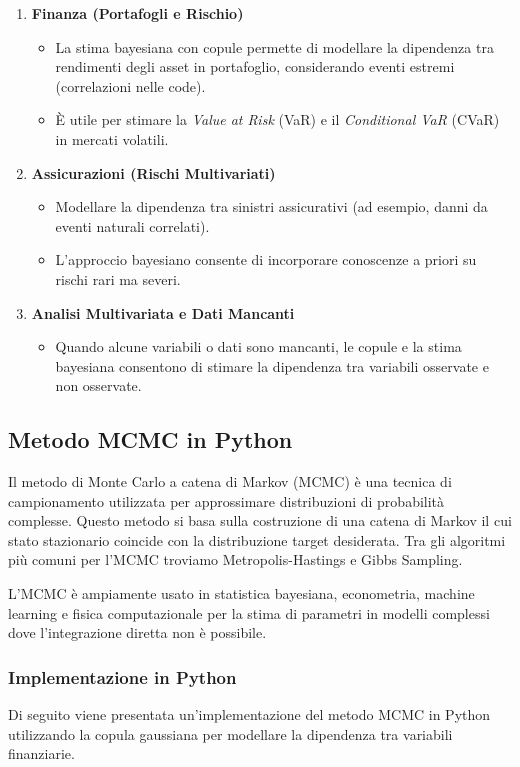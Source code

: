 \documentclass[%
	corpo=11pt,
    twoside,
    stile=classica,
    oldstyle,
    tipotesi=custom,
    greek,
    evenboxes,
]{toptesi}
\begin{document}
\begin{enumerate}
	\item \textbf{Finanza (Portafogli e Rischio)}
	\begin{itemize}
		\item La stima bayesiana con copule permette di modellare la dipendenza tra rendimenti degli asset in portafoglio, considerando eventi estremi (correlazioni nelle code).
		\item È utile per stimare la \textit{Value at Risk} (VaR) e il \textit{Conditional VaR} (CVaR) in mercati volatili.
	\end{itemize}
	
	\item \textbf{Assicurazioni (Rischi Multivariati)}
	\begin{itemize}
		\item Modellare la dipendenza tra sinistri assicurativi (ad esempio, danni da eventi naturali correlati).
		\item L’approccio bayesiano consente di incorporare conoscenze a priori su rischi rari ma severi.
	\end{itemize}
	
	\item \textbf{Analisi Multivariata e Dati Mancanti}
	\begin{itemize}
		\item Quando alcune variabili o dati sono mancanti, le copule e la stima bayesiana consentono di stimare la dipendenza tra variabili osservate e non osservate.
	\end{itemize}
\end{enumerate}

\subsection{Metodo MCMC in Python}
Il metodo di Monte Carlo a catena di Markov (MCMC) è una tecnica di campionamento utilizzata per approssimare distribuzioni di probabilità complesse. Questo metodo si basa sulla costruzione di una catena di Markov il cui stato stazionario coincide con la distribuzione target desiderata. Tra gli algoritmi più comuni per l'MCMC troviamo Metropolis-Hastings e Gibbs Sampling.

L'MCMC è ampiamente usato in statistica bayesiana, econometria, machine learning e fisica computazionale per la stima di parametri in modelli complessi dove l'integrazione diretta non è possibile.

\subsubsection{Implementazione in Python}
Di seguito viene presentata un'implementazione del metodo MCMC in Python utilizzando la copula gaussiana per modellare la dipendenza tra variabili finanziarie.\\
\end{document}
